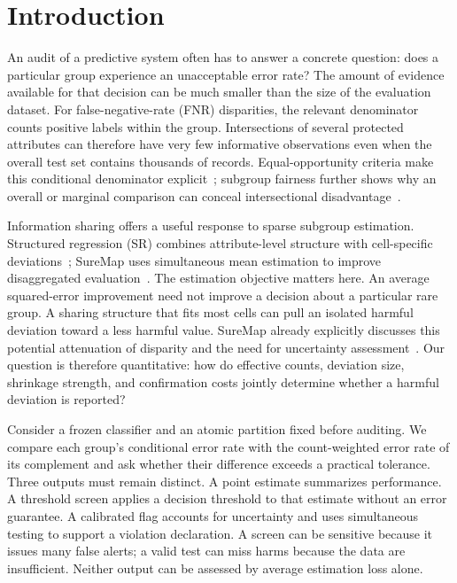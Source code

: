 \documentclass[Afour,sageh,times,doublespace]{sagej}
\begin{document}
\section{Introduction}\label{sec:intro}
An audit of a predictive system often has to answer a concrete question: does a particular group experience an unacceptable error rate? The amount of evidence available for that decision can be much smaller than the size of the evaluation dataset. For false-negative-rate (FNR) disparities, the relevant denominator counts positive labels within the group. Intersections of several protected attributes can therefore have very few informative observations even when the overall test set contains thousands of records. Equal-opportunity criteria make this conditional denominator explicit~\citep{hardt2016equality}; subgroup fairness further shows why an overall or marginal comparison can conceal intersectional disadvantage~\citep{kearns2018gerrymandering}.

Information sharing offers a useful response to sparse subgroup estimation. Structured regression (SR) combines attribute-level structure with cell-specific deviations~\citep{herlihy2024structured}; SureMap uses simultaneous mean estimation to improve disaggregated evaluation~\citep{khodak2024suremap}. The estimation objective matters here. An average squared-error improvement need not improve a decision about a particular rare group. A sharing structure that fits most cells can pull an isolated harmful deviation toward a less harmful value. SureMap already explicitly discusses this potential attenuation of disparity and the need for uncertainty assessment~\citep{khodak2024suremap}. Our question is therefore quantitative: how do effective counts, deviation size, shrinkage strength, and confirmation costs jointly determine whether a harmful deviation is reported?

Consider a frozen classifier and an atomic partition fixed before auditing. We compare each group's conditional error rate with the count-weighted error rate of its complement and ask whether their difference exceeds a practical tolerance. Three outputs must remain distinct. A point estimate summarizes performance. A threshold screen applies a decision threshold to that estimate without an error guarantee. A calibrated flag accounts for uncertainty and uses simultaneous testing to support a violation declaration. A screen can be sensitive because it issues many false alerts; a valid test can miss harms because the data are insufficient. Neither output can be assessed by average estimation loss alone.
\end{document}
